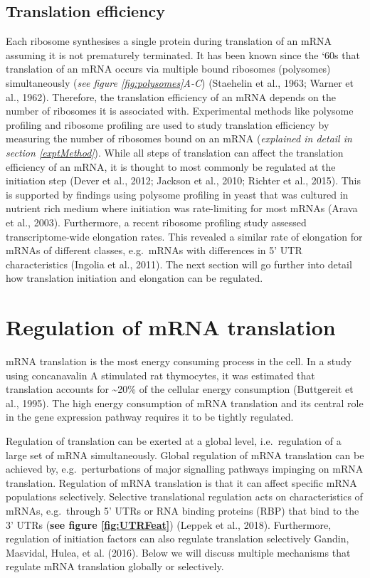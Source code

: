 \documentclass[
  12pt,
  openany]{book}
\begin{document}
\subsection{Translation efficiency} \label{transEff}

Each ribosome synthesises a single protein during translation of an mRNA assuming it is not prematurely terminated. It has been known since the `60s that translation of an mRNA occurs via multiple bound ribosomes (polysomes) simultaneously (\emph{see figure \ref{fig:polysomes}A-C}) (Staehelin et al., 1963; Warner et al., 1962). Therefore, the translation efficiency of an mRNA depends on the number of ribosomes it is associated with. Experimental methods like polysome profiling and ribosome profiling are used to study translation efficiency by measuring the number of ribosomes bound on an mRNA (\emph{explained in detail in section \ref{exptMethod}}). While all steps of translation can affect the translation efficiency of an mRNA, it is thought to most commonly be regulated at the initiation step (Dever et al., 2012; Jackson et al., 2010; Richter et al., 2015). This is supported by findings using polysome profiling in yeast that was cultured in nutrient rich medium where initiation was rate-limiting for most mRNAs (Arava et al., 2003). Furthermore, a recent ribosome profiling study assessed transcriptome-wide elongation rates. This revealed a similar rate of elongation for mRNAs of different classes, e.g.~mRNAs with differences in 5' UTR characteristics (Ingolia et al., 2011). The next section will go further into detail how translation initiation and elongation can be regulated.
\newline

\section{Regulation of mRNA translation} \label{regmRNA}

mRNA translation is the most energy consuming process in the cell. In a study using concanavalin A stimulated rat thymocytes, it was estimated that translation accounts for \textasciitilde20\% of the cellular energy consumption (Buttgereit et al., 1995). The high energy consumption of mRNA translation and its central role in the gene expression pathway requires it to be tightly regulated.

Regulation of translation can be exerted at a global level, i.e.~regulation of a large set of mRNA simultaneously. Global regulation of mRNA translation can be achieved by, e.g.~perturbations of major signalling pathways impinging on mRNA translation. Regulation of mRNA translation is that it can affect specific mRNA populations selectively. Selective translational regulation acts on characteristics of mRNAs, e.g.~through 5' UTRs or RNA binding proteins (RBP) that bind to the 3' UTRs (\textbf{see figure \ref{fig:UTRFeat}}) (Leppek et al., 2018). Furthermore, regulation of initiation factors can also regulate translation selectively Gandin, Masvidal, Hulea, et al. (2016). Below we will discuss multiple mechanisms that regulate mRNA translation globally or selectively.
\end{document}
